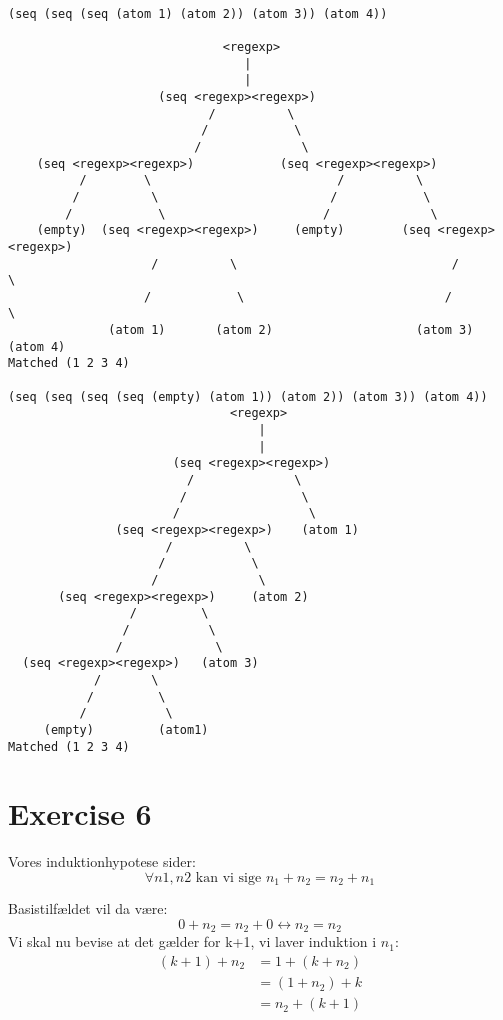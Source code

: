 \documentclass{article}
\begin{document}
\newpage
\begin{verbatim}

(seq (seq (seq (atom 1) (atom 2)) (atom 3)) (atom 4))
 
                              <regexp>
                                 |
                                 |
                     (seq <regexp><regexp>)
                            /          \
                           /            \
                          /              \
    (seq <regexp><regexp>)            (seq <regexp><regexp>)
          /        \                          /          \
         /          \                        /            \
        /            \                      /              \
    (empty)  (seq <regexp><regexp>)     (empty)        (seq <regexp><regexp>)
                    /          \                              /          \
                   /            \                            /            \
              (atom 1)       (atom 2)                    (atom 3)       (atom 4)
Matched (1 2 3 4)

(seq (seq (seq (seq (empty) (atom 1)) (atom 2)) (atom 3)) (atom 4))
                               <regexp>
                                   |
                                   |
                       (seq <regexp><regexp>)
                         /              \
                        /                \
                       /                  \
               (seq <regexp><regexp>)    (atom 1)
                      /          \
                     /            \
                    /              \
       (seq <regexp><regexp>)     (atom 2)
                 /         \
                /           \
               /             \
  (seq <regexp><regexp>)   (atom 3)
            /       \
           /         \
          /           \
     (empty)         (atom1)
Matched (1 2 3 4)

\end{verbatim}
\section*{Exercise 6}
Vores induktionhypotese sider: 
    $$ \forall n1, n2 \text{ kan vi sige } n_1+n_2 =n_2+n_1 $$
    
Basistilfældet vil da være:
$$ 0 + n_2 = n_2 + 0 \leftrightarrow n_2=n_2 $$
Vi skal nu bevise at det gælder for k+1, vi laver induktion i $n_1$:
        \begin{equation*}
            \begin{split}
                (k+1) + n_2 &= 1+(k+n_2)\\
                &=(1+n_2) + k\\
                &= n_2+(k+1)\\
            \end{split}
        \end{equation*}
\end{document}
